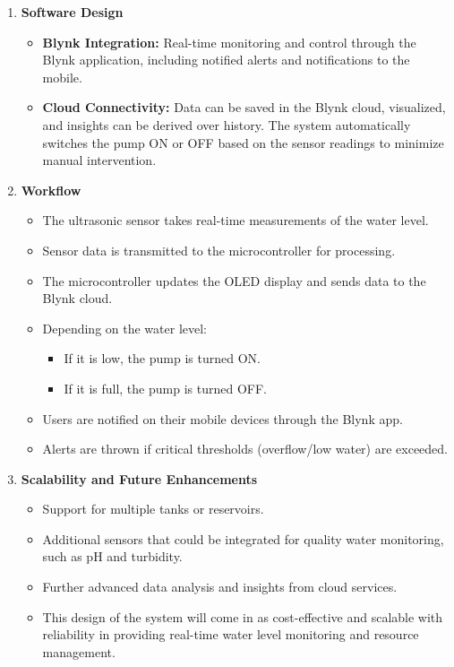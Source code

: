 {\begin{enumerate}
    \item \textbf{Software Design}
    \begin{itemize}
        \item \textbf{Blynk Integration:}  
        Real-time monitoring and control through the Blynk application, including notified alerts and notifications to the mobile.
        \item \textbf{Cloud Connectivity:}  
        Data can be saved in the Blynk cloud, visualized, and insights can be derived over history. The system automatically switches the pump ON or OFF based on the sensor readings to minimize manual intervention.
    \end{itemize}

    \item \textbf{Workflow}
    \begin{itemize}
        \item The ultrasonic sensor takes real-time measurements of the water level.
        \item Sensor data is transmitted to the microcontroller for processing.
        \item The microcontroller updates the OLED display and sends data to the Blynk cloud.
        \item Depending on the water level:
        \begin{itemize}
            \item If it is low, the pump is turned ON.
            \item If it is full, the pump is turned OFF.
        \end{itemize}
        \item Users are notified on their mobile devices through the Blynk app.
        \item Alerts are thrown if critical thresholds (overflow/low water) are exceeded.
    \end{itemize}

    \item \textbf{Scalability and Future Enhancements}
    \begin{itemize}
        \item Support for multiple tanks or reservoirs.
        \item Additional sensors that could be integrated for quality water monitoring, such as pH and turbidity.
        \item Further advanced data analysis and insights from cloud services.
        \item This design of the system will come in as cost-effective and scalable with reliability in providing real-time water level monitoring and resource management.
    \end{itemize}
\end{enumerate}

}
